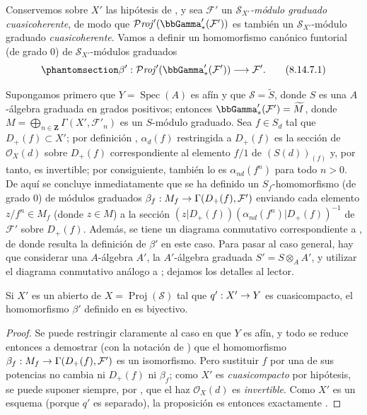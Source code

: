 \documentclass[oneside,10pt]{amsart}
\makeatletter
\newcommand{\ega@arrow}[2]{\mathchoice{#1}{#2}{#2}{#2}}
\renewcommand{\to}{\ega@arrow{\longrightarrow}{\rightarrow}}
\newcommand{\oldpage}[2][]{\marginnote{\normalfont\footnotesize\textbf{#1}~|~#2}\ignorespaces}
\let\EGAOriginalLabel\label
\renewcommand{\label}[1]{\phantomsection\EGAOriginalLabel{#1}}
\makeatother
\begin{document}
\begin{env}[8.14.7]
\label{II.8.14.7-fr}
Conservemos sobre $X'$ las hipótesis de , y sea $\mathcal{F}'$ un \emph{$\mathcal{S}_{X'}$-módulo graduado cuasicoherente}, de modo que $\mathcal{P}\mathit{roj}'(\bbGamma'_*(\mathcal{F}'))$ es también un $\mathcal{S}_{X'}$-módulo graduado \emph{cuasicoherente}.
\oldpage[II]{200}
Vamos a definir un homomorfismo canónico funtorial (de grado $0$) de $\mathcal{S}_{X'}$-módulos graduados
\begin{equation}
\label{II.8.14.7.1-fr}
  \beta':\mathcal{P}\mathit{roj}'(\bbGamma'_*(\mathcal{F}'))\to\mathcal{F}'.
\tag{8.14.7.1}
\end{equation}

Supongamos primero que $Y=\operatorname{Spec}(A)$ es afín y que $\mathcal{S}=\widetilde{S}$, donde $S$ es una $A$-álgebra graduada en grados positivos;
entonces $\bbGamma'_*(\mathcal{F}')=\widetilde{M}$, donde $M=\bigoplus_{n\in\mathbf{Z}}\Gamma(X',\mathcal{F}'_n)$ es un $S$-módulo graduado.
Sea $f\in S_d$ tal que $D_+(f)\subset X'$;
por definición , $\alpha_d(f)$ restringida a $D_+(f)$ es la sección de $\mathcal{O}_X(d)$ sobre $D_+(f)$ correspondiente al elemento $f/1$ de $(S(d))_{(f)}$ y, por tanto, es invertible;
por consiguiente, también lo es $\alpha_{nd}(f^n)$ para todo $n>0$.
De aquí se concluye inmediatamente que se ha definido un $S_f$-homomorfismo (de grado $0$) de módulos graduados $\beta_f:M_f\to\Gamma(D_+(f),\mathcal{F}')$ enviando cada elemento $z/f^n\in M_f$ (donde $z\in M$) a la sección $(z|D_+(f))(\alpha_{nd}(f^n)|D_+(f))^{-1}$ de $\mathcal{F}'$ sobre $D_+(f)$.
Además, se tiene un diagrama conmutativo correspondiente a , de donde resulta la definición de $\beta'$ en este caso.
Para pasar al caso general, hay que considerar una $A$-álgebra $A'$, la $A'$-álgebra graduada $S'=S\otimes_A A'$, y utilizar el diagrama conmutativo análogo a ;
dejamos los detalles al lector.
\end{env}

\begin{proposition}[8.14.8]
\label{II.8.14.8-fr}
Si $X'$ es un abierto de $X=\operatorname{Proj}(\mathcal{S})$ tal que $q':X'\to Y$ es cuasicompacto, el homomorfismo $\beta'$ definido en  es biyectivo.
\end{proposition}

\begin{proof}
Se puede restringir claramente al caso en que $Y$ es afín, y todo se reduce entonces a demostrar (con la notación de ) que el homomorfismo $\beta_f:M_f\to\Gamma(D_+(f),\mathcal{F}')$ es un isomorfismo.
Pero sustituir $f$ por una de sus potencias no cambia ni $D_+(f)$ ni $\beta_f$;
como $X'$ es \emph{cuasicompacto} por hipótesis, se puede suponer siempre, por , que el haz $\mathcal{O}_X(d)$ es \emph{invertible}.
Como $X'$ es un esquema (porque $q'$ es separado), la proposición es entonces exactamente .
\end{proof}
\end{document}
